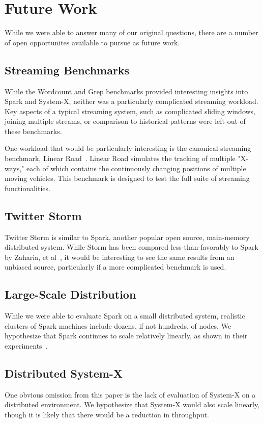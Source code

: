 \section{Future Work}
While we were able to answer many of our original questions, there are a number of open opportunites available to pursue as future work.

\subsection{Streaming Benchmarks}
While the Wordcount and Grep benchmarks provided interesting insights into Spark and System-X, neither was a particularly complicated streaming workload.  Key aspects of a typical streaming system, such as complicated sliding windows, joining multiple streams, or comparison to historical patterns were left out of these benchmarks.

One workload that would be particularly interesting is the canonical streaming benchmark, Linear Road~\cite{linearroad}.  Linear Road simulates the tracking of multiple "X-ways," each of which contains the continuously changing positions of multiple moving vehicles.  This benchmark is designed to test the full suite of streaming functionalities.

\subsection{Twitter Storm}
Twitter Storm is similar to Spark, another popular open source, main-memory distributed system.  While Storm has been compared less-than-favorably to Spark by Zaharia, et al~\cite{dstreams}, it would be interesting to see the same results from an unbiased source, particularly if a more complicated benchmark is used.

\subsection{Large-Scale Distribution}
While we were able to evaluate Spark on a small distributed system, realistic clusters of Spark machines include dozens, if not hundreds, of nodes.  We hypothesize that Spark continues to scale relatively linearly, as shown in their experiments~\cite{dstreams}.

\subsection{Distributed System-X}
One obvious omission from this paper is the lack of evaluation of System-X on a distributed environment.  We hypothesize that System-X would also scale linearly, though it is likely that there would be a reduction in throughput.

